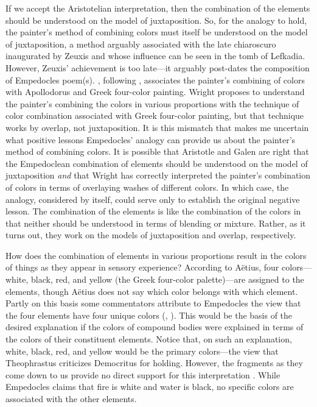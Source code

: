 If we accept the Aristotelian interpretation, then the combination of the elements should be understood on the model of juxtaposition. So, for the analogy to hold, the painter's method of combining colors must itself be understood on the model of juxtaposition, a method arguably associated with the late chiaroscuro inaugurated by Zeuxis and whose influence can be seen in the tomb of Lefkadia. However, Zeuxis' achievement is too late---it arguably post-dates the composition of Empedocles poem(s).  \citet[38--39]{Wright:1981zr}, following \citet[148]{Guthrie:1965ys}, associates the painter's combining of colors with Apollodorus and Greek four-color painting. Wright proposes to understand the painter's combining the colors in various proportions with the technique of color combination associated with Greek four-color painting, but that technique works by overlap, not juxtaposition. It is this mismatch that makes me uncertain what positive lessons Empedocles' analogy can provide us about the painter's method of combining colors. It is possible that Aristotle and Galen are right that the Empedoclean combination of elements should be understood on the model of juxtaposition \emph{and} that Wright has correctly interpreted the painter's combination of colors in terms of overlaying washes of different colors. In which case, the analogy, considered by itself, could serve only to establish the original negative lesson. The combination of the elements is like the combination of the colors in that neither should be understood in terms of blending or mixture. Rather, as it turns out, they work on the models of juxtaposition and overlap, respectively.

How does the combination of elements in various proportions result in the colors of things as they appear in sensory experience? According to Aëtius, four colors---white, black, red, and yellow (the Greek four-color palette)---are assigned to the elements, though Aëtius does not say which color belongs with which element. Partly on this basis some commentators attribute to Empedocles the view that the four elements have four unique colors (\citealt[217]{Cherniss:1935fk}, \citealt[152-3]{Siegel:1959fk}). This would be the basis of the desired explanation if the colors of compound bodies were explained in terms of the colors of their constituent elements. Notice that, on such an explanation, white, black, red, and yellow would be the primary colors---the view that Theophrastus criticizes Democritus for holding.  However, the fragments as they come down to us provide no direct support for this interpretation \citep[see][]{Ierodiakonou:2005fk}. While Empedocles claims that fire is white and water is black, no specific colors are associated with the other elements. 

